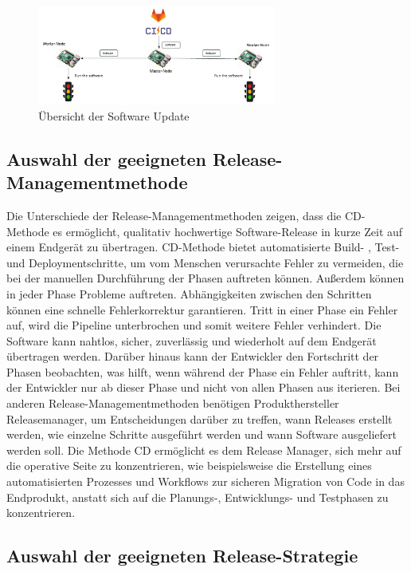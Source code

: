 \begin{figure}[bth] 
	\centering
	\includegraphics[width=0.7\textwidth]{Graphics/architektur.jpeg}
	\caption{Übersicht der Software Update}
	\label{fig:FW-Update-Strategie}
\end{figure}

\subsection{Auswahl der geeigneten Release-Managementmethode}

Die Unterschiede der Release-Managementmethoden zeigen, dass die \ac{CD}-Methode es ermöglicht, qualitativ hochwertige Software-Release in kurze Zeit auf einem Endgerät zu übertragen. \ac{CD}-Methode bietet automatisierte Build- , Test- und Deploymentschritte, um vom Menschen verursachte Fehler zu vermeiden, die bei der manuellen Durchführung der Phasen auftreten können. Außerdem können in jeder Phase Probleme auftreten. Abhängigkeiten zwischen den Schritten können eine schnelle Fehlerkorrektur garantieren. Tritt in einer Phase ein Fehler auf, wird die Pipeline unterbrochen und somit weitere Fehler verhindert. Die Software kann nahtlos, sicher, zuverlässig und wiederholt auf dem Endgerät übertragen werden. Darüber hinaus kann der Entwickler den Fortschritt der Phasen beobachten, was hilft, wenn während der Phase ein Fehler auftritt, kann der Entwickler nur ab dieser Phase und nicht von allen Phasen aus iterieren. Bei anderen Release-Managementmethoden benötigen Produkthersteller Releasemanager, um Entscheidungen darüber zu treffen, wann Releases erstellt werden, wie einzelne Schritte ausgeführt werden und wann Software ausgeliefert werden soll. Die Methode \ac{CD} ermöglicht es dem Release Manager, sich mehr auf die operative Seite zu konzentrieren, wie beispielsweise die Erstellung eines automatisierten Prozesses und Workflows zur sicheren Migration von Code in das Endprodukt, anstatt sich auf die Planungs-, Entwicklungs- und Testphasen zu konzentrieren.



\subsection{Auswahl der geeigneten Release-Strategie}

